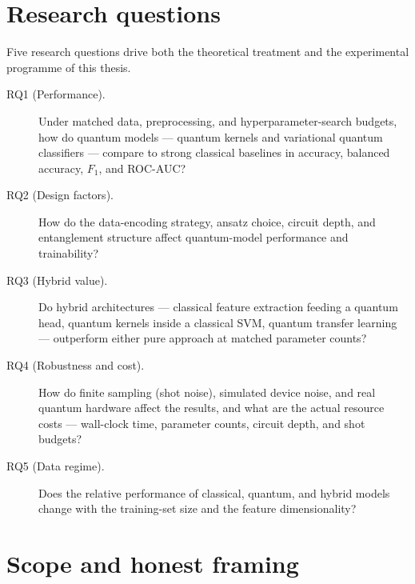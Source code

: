 \section{Research questions}
\label{sec:intro-rqs}

Five research questions drive both the theoretical treatment and the
experimental programme of this thesis.

\begin{description}
  \item[RQ1 (Performance).] Under matched data, preprocessing, and
  hyperparameter-search budgets, how do quantum models --- quantum kernels and
  variational quantum classifiers --- compare to strong classical baselines in
  accuracy, balanced accuracy, $F_1$, and ROC-AUC?

  \item[RQ2 (Design factors).] How do the data-encoding strategy, ansatz
  choice, circuit depth, and entanglement structure affect quantum-model
  performance and trainability?

  \item[RQ3 (Hybrid value).] Do hybrid architectures --- classical feature
  extraction feeding a quantum head, quantum kernels inside a classical SVM,
  quantum transfer learning --- outperform either pure approach at matched
  parameter counts?

  \item[RQ4 (Robustness and cost).] How do finite sampling (shot noise),
  simulated device noise, and real quantum hardware affect the results, and
  what are the actual resource costs --- wall-clock time, parameter counts,
  circuit depth, and shot budgets?

  \item[RQ5 (Data regime).] Does the relative performance of classical,
  quantum, and hybrid models change with the training-set size and the feature
  dimensionality?
\end{description}

\section{Scope and honest framing}
\label{sec:intro-framing}


